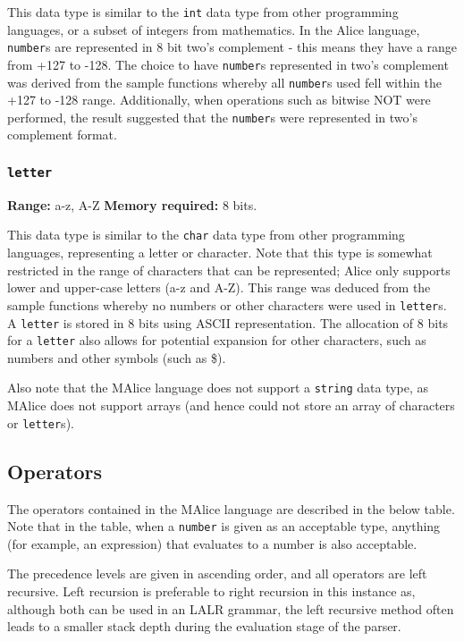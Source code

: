 \documentclass[a4wide, 10pt]{article}
\newcommand{\tab}{\hspace*{2em}}
\begin{document}
\tab This data type is similar to the \texttt{int} data type from other 
programming languages, or a subset of integers from mathematics. In the Alice 
language, \texttt{number}s are represented in 8 bit two's complement - this
means they have a range from +127 to -128. The choice to have \texttt{number}s
represented in two's complement was derived from the sample functions whereby
all \texttt{number}s used fell within the +127 to -128 range. Additionally, when
operations such as bitwise NOT were performed, the result suggested that the 
\texttt{number}s were represented in two's complement format.

\subsubsection{\texttt{letter}}

{\bf Range:} a-z, A-Z {\bf Memory required:} 8 bits.

\tab This data type is similar to the \texttt{char} data type from other
programming languages, representing a letter or character. Note that this type
is somewhat restricted in the range of characters that can be represented; Alice
only supports lower and upper-case letters (a-z and A-Z). This range was deduced
from the sample functions whereby no numbers or other characters were used in
\texttt{letter}s. A \texttt{letter} is stored in 8 bits using ASCII 
representation. The allocation of 8 bits for a \texttt{letter} also allows for
potential expansion for other characters, such as numbers and other symbols 
(such as \$).

Also note that the MAlice language does not support a \texttt{string} data 
type, as MAlice does not support arrays (and hence could not store an array of
characters or \texttt{letter}s).

\subsection{Operators}
The operators contained in the MAlice language are described in the below table.
Note that in the table, when a \texttt{number} is given as an acceptable type,
anything (for example, an expression) that evaluates to a number is also
acceptable.

The precedence levels are given in ascending order, and all operators are left
recursive. Left recursion is preferable to right recursion in this instance as,
although both can be used in an LALR grammar, the left recursive method often
leads to a smaller stack depth during the evaluation stage of the parser.
\cite{eac}
\end{document}
